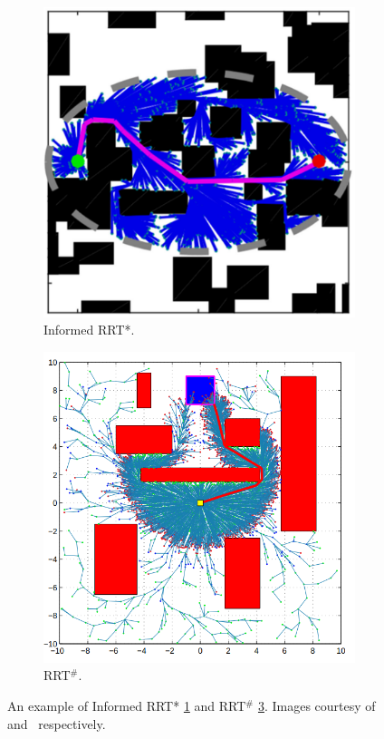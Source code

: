 \documentclass{ctuthesis}
\begin{document}
\begin{figure}[!ht]
  \centering 
  \begin{subfigure}[b]{0.48\textwidth}
    \includegraphics[width=\textwidth]{figChap3/InformedRRTstar_example.png}  
    \caption{Informed RRT*.}
    \label{fig:informedrrtstarExp}
  \end{subfigure}
  \begin{subfigure}[b]{0.49\textwidth}
      \includegraphics[width=\textwidth]{figChap3/RRTsharp_example.png}
      \caption{RRT$^\#$.}
      \label{fig:rrtsharpExp} 
  \end{subfigure}   
  \caption{An example of Informed RRT* \ref{fig:informedrrtstarExp} and RRT$^\#$ \ref{fig:rrtsharpExp}. 
  Images courtesy of~\cite{Gammell2018InformedRRTstar} and~\cite{arslan2012rrtsharp} respectively.}
\end{figure}
\end{document}
